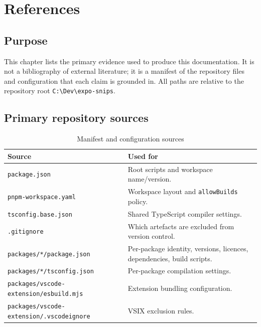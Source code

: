 \chapter{References}
\label{ch:references}

\section{Purpose}

This chapter lists the primary evidence used to produce this documentation. It
is not a bibliography of external literature; it is a manifest of the repository
files and configuration that each claim is grounded in. All paths are relative
to the repository root \texttt{C:\textbackslash Dev\textbackslash expo-snips}.

\section{Primary repository sources}

\begin{longtable}{p{6.2cm}p{8cm}}
\caption{Manifest and configuration sources}\\
\toprule
\textbf{Source} & \textbf{Used for} \\
\midrule

\texttt{package.json} & Root scripts and workspace name/version. \\
\texttt{pnpm-workspace.yaml} & Workspace layout and \texttt{allowBuilds} policy. \\
\texttt{tsconfig.base.json} & Shared TypeScript compiler settings. \\
\texttt{.gitignore} & Which artefacts are excluded from version control. \\
\texttt{packages/*/package.json} & Per-package identity, versions, licences,
dependencies, build scripts. \\
\texttt{packages/*/tsconfig.json} & Per-package compilation settings. \\
\texttt{packages/vscode-extension/esbuild.mjs} & Extension bundling configuration. \\
\texttt{packages/vscode-extension/.vscodeignore} & VSIX exclusion rules. \\
\bottomrule
\end{longtable}

